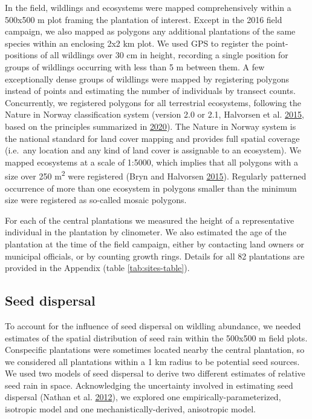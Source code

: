 \documentclass[
]{article}
\begin{document}
In the field, wildlings and ecosystems were mapped comprehensively within a 500x500 m plot framing the plantation of interest.
Except in the 2016 field campaign, we also mapped as polygons any additional plantations of the same species within an enclosing 2x2 km plot.
We used GPS to register the point-positions of all wildlings over 30 cm in height, recording a single position for groups of wildlings occurring with less than 5 m between them.
A few exceptionally dense groups of wildlings were mapped by registering polygons instead of points and estimating the number of individuals by transect counts.
Concurrently, we registered polygons for all terrestrial ecosystems, following the Nature in Norway classification system (version 2.0 or 2.1, Halvorsen et al. \protect\hyperlink{ref-halvorsenNaturNorgeNiN2015}{2015}, based on the principles summarized in \protect\hyperlink{ref-halvorsenSystematicsEcodiversityEcoSyst2020}{2020}).
The Nature in Norway system is the national standard for land cover mapping and provides full spatial coverage (i.e.~any location and any kind of land cover is assignable to an ecosystem).
We mapped ecosystems at a scale of 1:5000, which implies that all polygons with a size over 250 m\textsuperscript{2} were registered (Bryn and Halvorsen \protect\hyperlink{ref-brynVeilederKartleggingAv2015}{2015}).
Regularly patterned occurrence of more than one ecosystem in polygons smaller than the minimum size were registered as so-called mosaic polygons.

For each of the central plantations we measured the height of a representative individual in the plantation by clinometer.
We also estimated the age of the plantation at the time of the field campaign, either by contacting land owners or municipal officials, or by counting growth rings.
Details for all 82 plantations are provided in the Appendix (table \ref{tab:sites-table}).

\hypertarget{seed-dispersal}{%
\subsection{Seed dispersal}\label{seed-dispersal}}

To account for the influence of seed dispersal on wildling abundance, we needed estimates of the spatial distribution of seed rain within the 500x500 m field plots.
Conspecific plantations were sometimes located nearby the central plantation, so we considered all plantations within a 1 km radius to be potential seed sources.
We used two models of seed dispersal to derive two different estimates of relative seed rain in space.
Acknowledging the uncertainty involved in estimating seed dispersal (Nathan et al. \protect\hyperlink{ref-nathanDispersalKernels2012}{2012}), we explored one empirically-parameterized, isotropic model and one mechanistically-derived, anisotropic model.
\end{document}
